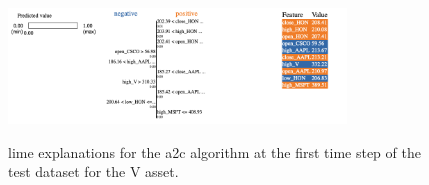 \begin{figure}
    \centering
    \includegraphics[width=0.8\textwidth]{figures/a2c_lime_v.png}
    \label{fig:a2c_lime_v}
    \caption{\acrshort{lime} explanations for the \acrshort{a2c} algorithm at the first time step of the test dataset for the V asset.}
\end{figure}

